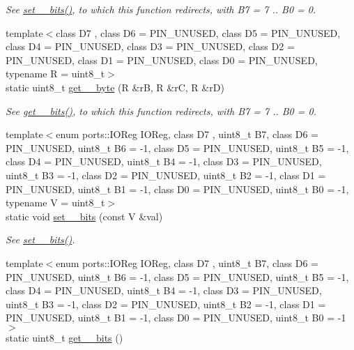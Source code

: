 \begin{DoxyCompactItemize}
\begin{DoxyCompactList}\small\item\em See \hyperlink{namespaceports_aac15fb87d8fede3f2bf8d764ab42965f}{set\+\_\+\_\+bits()}, to which this function redirects, with {\ttfamily B7 = 7} .. {\ttfamily B0 = 0}. \end{DoxyCompactList}\item 
{\footnotesize template$<$class D7 , class D6  = P\+I\+N\+\_\+\+U\+N\+U\+S\+ED, class D5  = P\+I\+N\+\_\+\+U\+N\+U\+S\+ED, class D4  = P\+I\+N\+\_\+\+U\+N\+U\+S\+ED, class D3  = P\+I\+N\+\_\+\+U\+N\+U\+S\+ED, class D2  = P\+I\+N\+\_\+\+U\+N\+U\+S\+ED, class D1  = P\+I\+N\+\_\+\+U\+N\+U\+S\+ED, class D0  = P\+I\+N\+\_\+\+U\+N\+U\+S\+ED, typename R  = uint8\+\_\+t$>$ }\\static uint8\+\_\+t \hyperlink{namespaceports_ae7d1ffc9ed6454ca61b006ffe43e4e6e}{get\+\_\+\_\+byte} (R \&rB, R \&rC, R \&rD)
\begin{DoxyCompactList}\small\item\em See \hyperlink{namespaceports_a9a1959ec95780c00a964b174a27b2a37}{get\+\_\+\_\+bits()}, to which this function redirects, with {\ttfamily B7 = 7} .. {\ttfamily B0 = 0}. \end{DoxyCompactList}\item 
{\footnotesize template$<$enum ports\+::\+I\+O\+Reg I\+O\+Reg, class D7 , uint8\+\_\+t B7, class D6  = P\+I\+N\+\_\+\+U\+N\+U\+S\+ED, uint8\+\_\+t B6 = -\/1, class D5  = P\+I\+N\+\_\+\+U\+N\+U\+S\+ED, uint8\+\_\+t B5 = -\/1, class D4  = P\+I\+N\+\_\+\+U\+N\+U\+S\+ED, uint8\+\_\+t B4 = -\/1, class D3  = P\+I\+N\+\_\+\+U\+N\+U\+S\+ED, uint8\+\_\+t B3 = -\/1, class D2  = P\+I\+N\+\_\+\+U\+N\+U\+S\+ED, uint8\+\_\+t B2 = -\/1, class D1  = P\+I\+N\+\_\+\+U\+N\+U\+S\+ED, uint8\+\_\+t B1 = -\/1, class D0  = P\+I\+N\+\_\+\+U\+N\+U\+S\+ED, uint8\+\_\+t B0 = -\/1, typename V  = uint8\+\_\+t$>$ }\\static void \hyperlink{namespaceports_ac9262ca010e65ff684986eef2900942f}{set\+\_\+\_\+bits} (const V \&val)
\begin{DoxyCompactList}\small\item\em See \hyperlink{namespaceports_aac15fb87d8fede3f2bf8d764ab42965f}{set\+\_\+\_\+bits()}. \end{DoxyCompactList}\item 
{\footnotesize template$<$enum ports\+::\+I\+O\+Reg I\+O\+Reg, class D7 , uint8\+\_\+t B7, class D6  = P\+I\+N\+\_\+\+U\+N\+U\+S\+ED, uint8\+\_\+t B6 = -\/1, class D5  = P\+I\+N\+\_\+\+U\+N\+U\+S\+ED, uint8\+\_\+t B5 = -\/1, class D4  = P\+I\+N\+\_\+\+U\+N\+U\+S\+ED, uint8\+\_\+t B4 = -\/1, class D3  = P\+I\+N\+\_\+\+U\+N\+U\+S\+ED, uint8\+\_\+t B3 = -\/1, class D2  = P\+I\+N\+\_\+\+U\+N\+U\+S\+ED, uint8\+\_\+t B2 = -\/1, class D1  = P\+I\+N\+\_\+\+U\+N\+U\+S\+ED, uint8\+\_\+t B1 = -\/1, class D0  = P\+I\+N\+\_\+\+U\+N\+U\+S\+ED, uint8\+\_\+t B0 = -\/1$>$ }\\static uint8\+\_\+t \hyperlink{namespaceports_a2a0a17506421aaa10b7c087124a09b72}{get\+\_\+\_\+bits} ()

\end{DoxyCompactItemize}
